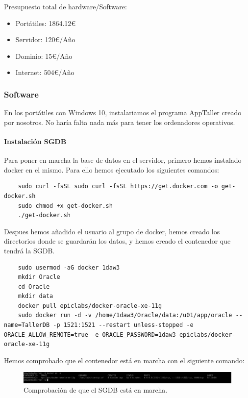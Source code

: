 \documentclass{article}
\begin{document}
Presupuesto total de hardware/Software: \\
\begin{itemize}
  \item Portátiles: 1864.12€
  \item Servidor: 120€/Año
  \item Dominio: 15€/Año
  \item Internet: 504€/Año
\end{itemize}
\subsubsection{Software}
\label{subsubsection:Software}
{
En los portátiles con Windows 10, instalariamos el programa AppTaller creado por nosotros. No haría falta nada más para tener los ordenadores operativos. \\ 
\paragraph{Instalación SGDB}
Para poner en marcha la base de datos en el servidor, primero hemos instalado docker en el mismo. Para ello hemos ejecutado los siguientes comandos: 
  \begin{lstlisting}
    sudo curl -fsSL sudo curl -fsSL https://get.docker.com -o get-docker.sh
    sudo chmod +x get-docker.sh
    ./get-docker.sh
  \end{lstlisting}
  Despues hemos añadido el usuario al grupo de docker, hemos creado los directorios donde se guardarán 
  los datos, y hemos creado el contenedor que tendrá la SGDB.
  \begin{lstlisting}
    sudo usermod -aG docker 1daw3
    mkdir Oracle
    cd Oracle 
    mkdir data 
    docker pull epiclabs/docker-oracle-xe-11g
    sudo docker run -d -v /home/1daw3/Oracle/data:/u01/app/oracle --name=TallerDB -p 1521:1521 --restart unless-stopped -e ORACLE_ALLOW_REMOTE=true -e ORACLE_PASSWORD=1daw3 epiclabs/docker-oracle-xe-11g
  \end{lstlisting}
  Hemos comprobado que el contenedor está en marcha con el siguiente comando: 
  \begin{figure}[H]
    \centering
    \includegraphics[width=1.0\textwidth]{CapturasSistemas/oracleEnMarcha.PNG}
    \caption{Comprobación de que el SGDB está en marcha.}
  \end{figure}
}
\end{document}
